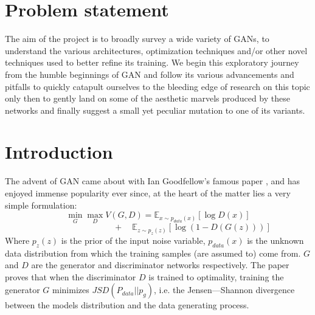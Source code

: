 \documentclass{article}
\begin{document}
\section{Problem statement}
\label{problem statement}
The aim of the project is to broadly survey a wide variety of GANs, to understand the various architectures, optimization techniques and/or other novel techniques used to better refine its training. We begin this exploratory journey from the humble beginnings of GAN \cite{ganpaper} and follow its various advancements and pitfalls \cite{towards} to quickly catapult ourselves to the bleeding edge of research on this topic \cite{wgan} only then to gently land on some of the aesthetic marvels produced by these networks \cite{cyclegan} and finally suggest a small yet peculiar mutation to one of its variants.
\section{Introduction}
\label{Introduction}
The advent of GAN came about with Ian Goodfellow's famous paper \cite{ganpaper}, and has enjoyed immense popularity ever since, at the heart of the matter lies a very simple formulation:
\[\min_G\max_DV(G,D)=\mathbb{E}_{x\sim p_{data}(x)}[\log D(x)] \]
\[\quad \quad \quad \quad \quad \quad \quad \quad + \quad \mathbb{E}_{z\sim p_z(z)}[\log (1-D(G(z)))]\]
Where $p_z(z)$ is the prior of the input noise variable, $p_{data}(x)$ is the unknown data distribution from which the training samples (are assumed to) come from. $G$ and $D$ are the generator and discriminator networks respectively.\newline
The paper proves that when the discriminator $D$ is trained to optimality, training the generator $G$ minimizes $JSD(P_{data}||p_{g})$, i.e. the Jensen---Shannon divergence between the model\textquotesingle s distribution and the data generating process.
\end{document}
